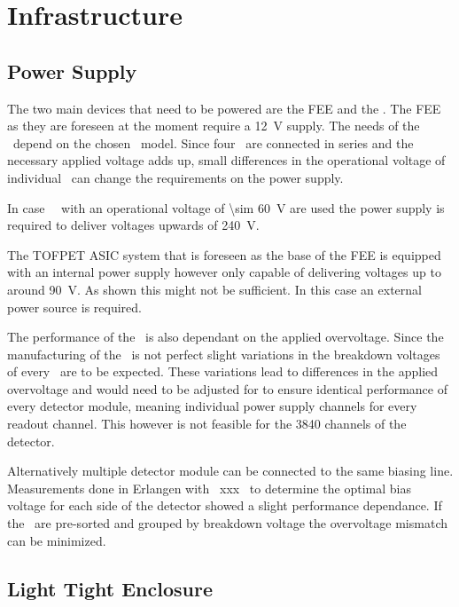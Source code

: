 \documentclass[../BTOF_summary.tex]{subfiles}
\begin{document}
\section{Infrastructure}

\subsection{Power Supply}

The two main devices that need to be powered are the FEE and the \sipms .
The FEE as they are foreseen at the moment require a \SI{12}{V} supply.
The needs of the \sipms\ depend on the chosen \sipm\ model. Since four \sipms\ are connected in series and the necessary applied voltage adds up, small differences in the operational voltage of individual \sipms\ can change the requirements on the power supply.

In case \hamamatsu\ \sipms\ with an operational voltage of \SI{\sim 60}{V} are used the power supply is required to deliver voltages upwards of \SI{240}{V}.

The TOFPET ASIC system that is foreseen as the base of the FEE is equipped with an internal power supply however only capable of delivering voltages up to around \SI{90}{V}.
As shown this might not be sufficient.
In this case an external power source is required.

The performance of the \sipms\ is also dependant on the applied overvoltage.
Since the manufacturing of the \sipms\ is not perfect slight variations in the breakdown voltages of every \sipm\ are to be expected.
These variations lead to differences in the applied overvoltage and would need to be adjusted for to ensure identical performance of every detector module, meaning individual power supply channels for every readout channel.
This however is not feasible for the 3840 channels of the detector.

Alternatively multiple detector module can be connected to the same biasing line.
Measurements done in Erlangen with \hamamatsu\ xxx \sipms\ to determine the optimal bias voltage for each side of the detector showed a slight performance dependance.
If the \sipms\ are pre-sorted and grouped by breakdown voltage the overvoltage mismatch can be minimized.

\subsection{Light Tight Enclosure}
\end{document}

